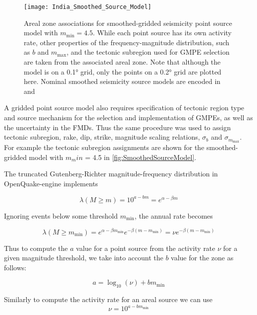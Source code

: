 \documentclass{article}
\begin{document}
\begin{figure}
\begin{adjustbox}{center}
\texttt{[image: India\_Smoothed\_Source\_Model]}
\end{adjustbox}
\caption[Smoothed-gridded seismicity point source model]{Areal zone associations for smoothed-gridded seismicity point source model with $m_\text{min} = 4.5$.
While each point source has its own activity rate, other properties of the frequency-magnitude distribution, such as $b$ and $m_\text{max}$, and the tectonic subregion used for GMPE selection are taken from the associated areal zone.
Note that although the model is on a 0.1° grid, only the points on a 0.2° grid are plotted here.
Nominal smoothed seismicity source models are encoded in \texttt{} and \texttt{}}
\label{fig:SmoothedSourceModel}
\end{figure}

A gridded point source model also requires specification of  tectonic region type and source mechanism for the selection and implementation of GMPEs, as well as the uncertainty in the FMDs.
Thus the same procedure was used to assign tectonic subregion, rake, dip, strike, magnitude scaling relations, $\sigma_b$ and $\sigma_{m_\text{max}}$. For example the tectonic subregion assignments are shown for the smoothed-gridded model with $m_min$ = 4.5 in \autoref{fig:SmoothedSourceModel}.

The truncated Gutenberg-Richter magnitude-frequency distribution in OpenQuake-engine implements

$$ \lambda(M \geq m) = 10^{a - b m} = e^{\alpha - \beta m} $$

Ignoring events below some threshold $m_\text{min}$, the annual rate becomes

$$ \lambda(M \geq m_\text{min}) = e^{\alpha - \beta m_\text{min}} e^{-\beta (m - m_\text{min})} = \nu e^{-\beta (m - m_\text{min})} $$

Thus to compute the $a$ value for a point source from the activity rate $\nu$ for a given magnitude threshold, we take into account the $b$ value for the zone as follows:

$$a = \log_{10}(\nu) + b m_\text{min} $$

Similarly to compute the activity rate for an areal source we can use
\begin{equation} \label{eq:ArealActivity} 
\nu = 10^{a - b m_\text{min}}
\end{equation}
\end{document}
